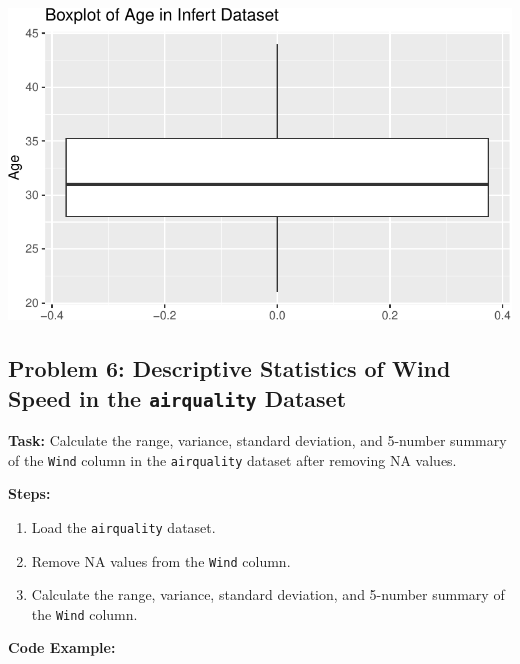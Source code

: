 \documentclass[
  letterpaper,
  DIV=11,
  numbers=noendperiod]{scrreprt}
\providecommand{\tightlist}{%
  \setlength{\itemsep}{0pt}\setlength{\parskip}{0pt}}\usepackage{longtable,booktabs,array}
\begin{document}
\includegraphics{Measures_of_Variability_files/figure-pdf/unnamed-chunk-19-1.pdf}

\subsection*{\texorpdfstring{Problem 6: Descriptive Statistics of Wind
Speed in the \texttt{airquality}
Dataset}{Problem 6: Descriptive Statistics of Wind Speed in the airquality Dataset}}\label{problem-6-descriptive-statistics-of-wind-speed-in-the-airquality-dataset}

\textbf{Task:} Calculate the range, variance, standard deviation, and
5-number summary of the \texttt{Wind} column in the \texttt{airquality}
dataset after removing NA values.

\textbf{Steps:}

\begin{enumerate}
\def\labelenumi{\arabic{enumi}.}
\tightlist
\item
  Load the \texttt{airquality} dataset.
\item
  Remove NA values from the \texttt{Wind} column.
\item
  Calculate the range, variance, standard deviation, and 5-number
  summary of the \texttt{Wind} column.
\end{enumerate}

\textbf{Code Example:}
\end{document}
